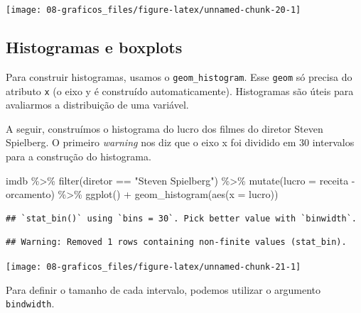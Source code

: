 \documentclass[
]{book}
\newenvironment{Shaded}{\begin{snugshade}}{\end{snugshade}}
\newcommand{\AttributeTok}[1]{\textcolor[rgb]{0.77,0.63,0.00}{#1}}
\newcommand{\FunctionTok}[1]{\textcolor[rgb]{0.00,0.00,0.00}{#1}}
\newcommand{\NormalTok}[1]{#1}
\newcommand{\SpecialCharTok}[1]{\textcolor[rgb]{0.00,0.00,0.00}{#1}}
\newcommand{\StringTok}[1]{\textcolor[rgb]{0.31,0.60,0.02}{#1}}
\begin{document}
\begin{center}\texttt{[image: 08-graficos\_files/figure-latex/unnamed-chunk-20-1]} \end{center}

\hypertarget{histogramas-e-boxplots}{%
\subsection{Histogramas e boxplots}\label{histogramas-e-boxplots}}

Para construir histogramas, usamos o \texttt{geom\_histogram}. Esse \texttt{geom} só precisa do atributo \texttt{x} (o eixo y é construído automaticamente). Histogramas são úteis para avaliarmos a distribuição de uma variável.

A seguir, construímos o histograma do lucro dos filmes do diretor Steven Spielberg.
O primeiro \emph{warning} nos diz que o eixo x foi dividido em 30 intervalos para a construção do histograma.

\begin{Shaded}
\begin{Highlighting}[]
\NormalTok{imdb }\SpecialCharTok{\%\textgreater{}\%} 
  \FunctionTok{filter}\NormalTok{(diretor }\SpecialCharTok{==} \StringTok{"Steven Spielberg"}\NormalTok{) }\SpecialCharTok{\%\textgreater{}\%}
  \FunctionTok{mutate}\NormalTok{(}\AttributeTok{lucro =}\NormalTok{ receita }\SpecialCharTok{{-}}\NormalTok{ orcamento) }\SpecialCharTok{\%\textgreater{}\%} 
  \FunctionTok{ggplot}\NormalTok{() }\SpecialCharTok{+}
  \FunctionTok{geom\_histogram}\NormalTok{(}\FunctionTok{aes}\NormalTok{(}\AttributeTok{x =}\NormalTok{ lucro))}
\end{Highlighting}
\end{Shaded}

\begin{verbatim}
## `stat_bin()` using `bins = 30`. Pick better value with `binwidth`.
\end{verbatim}

\begin{verbatim}
## Warning: Removed 1 rows containing non-finite values (stat_bin).
\end{verbatim}

\begin{center}\texttt{[image: 08-graficos\_files/figure-latex/unnamed-chunk-21-1]} \end{center}

Para definir o tamanho de cada intervalo, podemos utilizar o argumento \texttt{bindwidth}.
\end{document}
